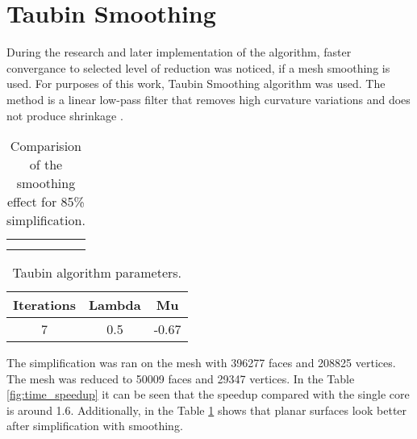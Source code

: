 \newpage
\section{Taubin Smoothing}

During the research and later implementation of the algorithm, faster convergance to selected level of reduction was noticed, if a mesh smoothing is used. For purposes of this work, Taubin Smoothing algorithm was used. The method is a linear low-pass filter that removes high curvature variations and does not produce shrinkage \cite{taubin95}.

\begin{center}
  	\begin{table}[h!]
  	\begin{center}
  	\begin{tabular}{cc}
	\begin{subfigure}{1\textwidth}\centering\includegraphics
		[width=0.8\columnwidth]{smooth}\caption{Simplification with smoothing}\label{smooth}\end{subfigure}\\
	\begin{subfigure}{1\textwidth}\centering\includegraphics
		[width=0.8\columnwidth]{non_smooth}\caption{Simplification without smoothing}\label{non_smooth}\end{subfigure}
	\end{tabular}
	\caption{Comparision of the smoothing effect for 85\% simplification.}
  	\label{tab:smoothing_effect}
  	\end{center}
	\end{table}
\end{center}

\begin{table}[h!]
\centering
\begin{tabular}{ |c|c|c| } 
 \hline
 Iterations & Lambda & Mu\\
 \hline
 7 & 0.5 & -0.67\\ 
 \hline
\end{tabular}
\caption{Taubin algorithm parameters.}
\end{table}
\newpage
The simplification was ran on the mesh with 396277 faces and 208825 vertices. The mesh was reduced to 50009 faces and 29347 vertices. In the Table \ref{fig:time_speedup} it can be seen that the speedup compared with the single core is around 1.6. Additionally, in the Table \ref{tab:smoothing_effect} shows that planar surfaces look better after simplification with smoothing.

